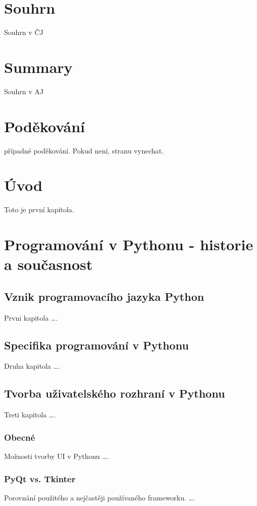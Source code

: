 \documentclass[a4paper, 12pt]{article}
\begin{document}
%
%
\section*{Souhrn}

Souhrn v ČJ

\section*{Summary}
Souhrn v AJ

%
%
\newpage
\section*{Poděkování}
případné poděkování. Pokud není, stranu vynechat.
\newpage
\tableofcontents
\newpage

\section{Úvod}
Toto je první kapitola.

\newpage
\section{Programování v Pythonu - historie a současnost}

\subsection{Vznik programovacího jazyka Python}
Prvni kapitola \ldots .

\subsection{Specifika programování v Pythonu}
Druha kapitola \ldots .

\subsection{Tvorba uživatelského rozhraní v Pythonu}
Treti kapitola \ldots .

\subsubsection{Obecné}
Možnosti tvorby UI v Pythonu \ldots .
\subsubsection{PyQt vs. Tkinter}
Porovnání použitého a nejčastěji používaného frameworku. \ldots .
\end{document}
